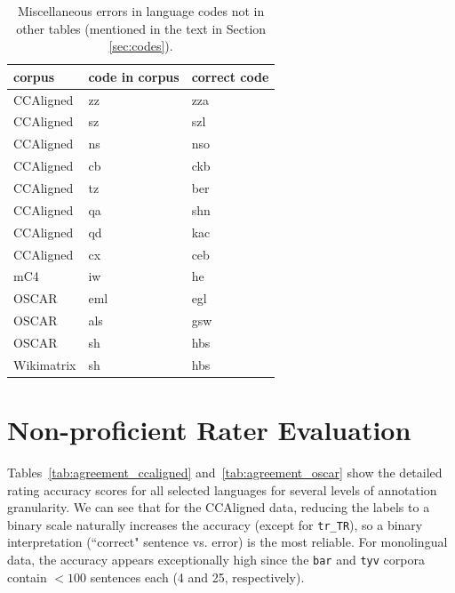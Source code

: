 \begin{table}[!ht]
    \small
    \centering
    \begin{tabular}{lll}
        \toprule
        corpus     & code in corpus & correct code \\
        \hline
        CCAligned  & zz             & zza          \\
        CCAligned  & sz             & szl          \\
        CCAligned  & ns             & nso          \\
        CCAligned  & cb             & ckb          \\
        CCAligned  & tz             & ber          \\
        CCAligned  & qa             & shn          \\
        CCAligned  & qd             & kac          \\
        CCAligned  & cx             & ceb          \\
        mC4        & iw             & he           \\
        OSCAR      & eml            & egl          \\
        OSCAR      & als            & gsw          \\
        OSCAR      & sh             & hbs          \\
        Wikimatrix & sh             & hbs          \\
        \bottomrule
    \end{tabular}
    \caption{Miscellaneous errors in language codes not in other tables (mentioned in the text in Section \ref{sec:codes}).}
    \label{tab:misc_codes}
\end{table}


\section{Non-proficient Rater Evaluation}\label{app:agreement}

Tables~\ref{tab:agreement_ccaligned} and~\ref{tab:agreement_oscar} show the detailed rating accuracy scores for all selected languages for several levels of annotation granularity. We can see that for the CCAligned data, reducing the labels to a binary scale naturally increases the accuracy (except for \texttt{tr\_TR}), so a binary interpretation (``correct" sentence vs. error) is the most reliable. For monolingual data, the accuracy appears exceptionally high since the \texttt{bar} and \texttt{tyv} corpora contain $<100$ sentences each (4 and 25, respectively).


